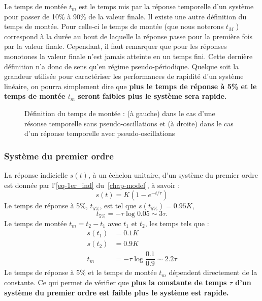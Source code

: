 Le temps de montée $t_m$ est le temps mis par la réponse temporelle d'un 
système pour passer de 10\% à 90\% de la valeur finale. Il existe une autre 
définition du temps de montée. Pour celle-ci le temps de montée (que nous 
noterons $t_{M}$ ) correspond à la durée au bout de laquelle la 
réponse passe pour la première fois par la valeur finale. Cependant, 
il faut remarquer que pour les réponses monotones la valeur finale n'est 
jamais atteinte en un temps fini. Cette dernière définition
n'a donc de sens qu'en régime pseudo-périodique.
Quelque soit la grandeur utilisée pour caractériser les performances de rapidité
d'un système linéaire, on pourra simplement dire que 
\textbf{plus le temps de réponse à 5\% et le temps de montée $t_m$ seront 
faibles plus le système sera rapide.}
\begin{figure}[!h]
    \centering
    
    
    \caption{Définition du temps de montée : (à gauche) dans le cas
             d'une résonse temporelle sans pseudo-oscillations et (à droite) 
             dans le cas d'un réponse temporelle avec pseudo-oscillations}
\end{figure}
\subsubsection{Système du premier ordre}
La réponse indicielle $s(t)$, à un échelon unitaire, 
d'un système du premier ordre est donnée par l'\cref{eq-1er_ind} 
du~\cref{chap-model}, à savoir :
\[
s(t)=K\left(1-e^{-t/\tau}\right)
\]
Le temps de réponse à 5\%, $t_{5\%}$, est tel que $s(t_{5\%})=0.95K$, 
\[
t_{5\%}=-\tau\log{0.05}\sim3\tau.
\]
Le temps de montée $t_m=t_2-t_1$ avec $t_1$ et $t_2$, les temps tels que :
\begin{align*}
    s(t_1)&=0.1K\\
    s(t_2)&=0.9K\\
    t_m   &=-\tau\log{\dfrac{0.1}{0.9}}\sim2.2\tau
\end{align*}
Le temps de réponse à 5\% et le temps de montée $t_m$ dépendent 
directement de la constante. Ce qui permet de vérifier que 
\textbf{plus la constante de temps $\tau$ d'un système du premier
ordre est faible plus le système est rapide.}
